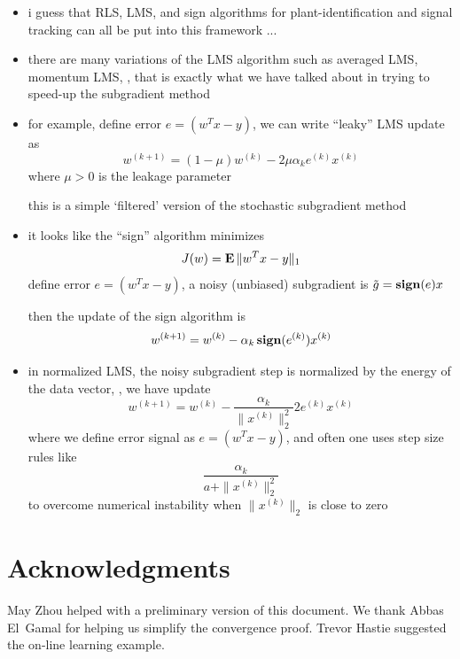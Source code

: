 \documentclass[12pt]{article}
\newcommand{\sign}{\mathop{\bf sign}}
\begin{document}
\begin{itemize}
\item i guess that RLS, LMS, and sign algorithms
for plant-identification and signal tracking
can all be put into this framework ...

\item there are many variations of the LMS algorithm
such as averaged LMS, momentum LMS, \etc,
that is exactly what we have talked about in trying to
speed-up the subgradient method

\item for example, define error $e = ( w^T x - y )$,
we can write ``leaky'' LMS update as
\[
w^{(k+1)} = (1 - \mu) w^{(k)} - 2\mu \alpha_k e^{(k)}x^{(k)}
\]
where $\mu > 0$ is the leakage parameter

this is a simple `filtered' version of the stochastic
subgradient method

\item
it looks like the ``sign'' algorithm minimizes
\[
J(w) = \mathop{\bf E{}} \| w^T x - y \|_1
\]
define error $e = ( w^T x - y )$,
a noisy (unbiased) subgradient is
$\tilde g = \sign(e)x$

then the update of the sign algorithm is
\[
w^{(k+1)} = w^{(k)} - \alpha_k \sign(e^{(k)}) x^{(k)}
\]

\item in normalized LMS, the noisy subgradient step
is normalized by the energy of the data vector, \ie,
we have update
\[
w^{(k+1)} = w^{(k)} - \frac{\alpha_k}{\|x^{(k)}\|_2^2}
2 e^{(k)} x^{(k)}
\]
where we define error signal as $e = ( w^T x - y )$,
and often one uses step size rules like
\[
\frac{\alpha_k}{a + \|x^{(k)}\|_2^2}
\]
to overcome numerical instability when $\|x^{(k)}\|_2$
is close to zero
\end{itemize}
\fi


\section*{Acknowledgments}

May Zhou helped with a preliminary version of this document.
We thank Abbas El~Gamal for helping us simplify the convergence proof.
Trevor Hastie suggested the on-line learning example.


\end{document}
